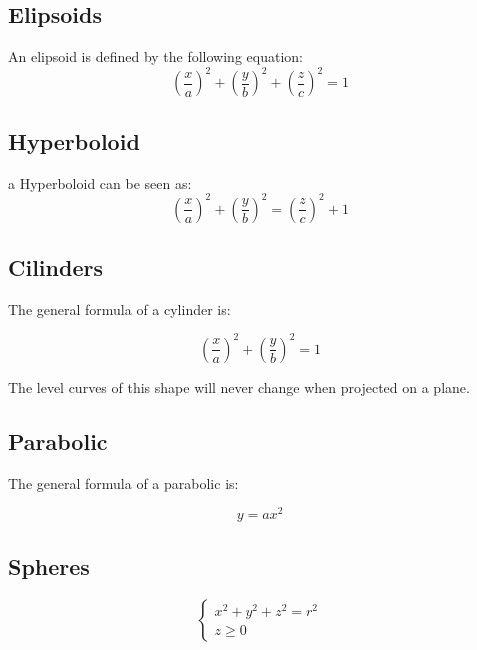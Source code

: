 \documentclass[11pt,fleqn]{book} %
\begin{document}
\subsection{Elipsoids}

An elipsoid is defined by the following equation:
\begin{equation}
    (\frac{x}{a})^2+(\frac{y}{b})^2+(\frac{z}{c})^2 = 1
\end{equation}


\subsection{Hyperboloid}

a Hyperboloid can be seen as:
\begin{equation}
    (\frac{x}{a})^2+(\frac{y}{b})^2 = (\frac{z}{c})^2 + 1
\end{equation}

\subsection{Cilinders}

The general formula of a cylinder is:

\begin{equation}
    (\frac{x}{a})^2+(\frac{y}{b})^2 = 1
\end{equation}

The level curves of this shape will never change when projected on a plane.

\subsection{Parabolic}

The general formula of a parabolic is:

\begin{equation}
    y = ax^2
\end{equation}

\subsection{Spheres}

\begin{equation}
    \begin{cases}
        x^2+y^2+z^2 = r^2 \\
        z \geq 0
    \end{cases}
\end{equation}
\end{document}

